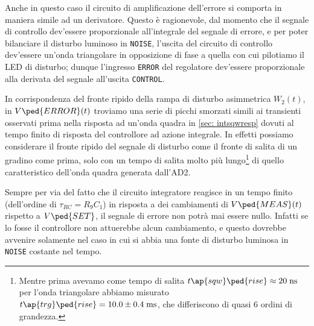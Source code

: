 \documentclass[10pt, a4paper, italian]{article}
\begin{document}
Anche in questo caso il circuito di amplificazione dell'errore si comporta
in maniera simile ad un derivatore. Questo è ragionevole, dal momento che il
segnale di controllo dev'essere proporzionale all'integrale del
segnale di errore, e per poter bilanciare il disturbo luminoso in \verb+NOISE+,
l'uscita del circuito di controllo dev'essere un'onda triangolare in
opposizione di fase a quella con cui pilotiamo il LED di disturbo; dunque
l'ingresso \verb+ERROR+ del regolatore dev'essere proporzionale alla derivata
del segnale all'uscita \verb+CONTROL+.

In corrispondenza del fronte ripido della rampa di disturbo asimmetrica
$W_2 (t)$, in $V\ped{ERROR} (t)$ troviamo una serie di picchi smorzati
simili ai transienti osservati prima nella risposta ad un'onda quadra
in \cref{sec: intsqwresp} dovuti al tempo finito di risposta del controllore
ad azione integrale.
In effetti possiamo considerare il fronte ripido del segnale di disturbo come
il fronte di salita di un gradino come prima, solo con un tempo di salita
molto più lungo\footnote{Mentre prima avevamo come tempo di salita
$t\ap{sqw}\ped{rise} \approx 20 \; \si{n\s}$ per l'onda triangolare abbiamo
misurato $t\ap{trg}\ped{rise} = 10.0 \pm 0.4 \; \si{m\s}$, che differiscono
di quasi 6 ordini di grandezza.} di quello caratteristico dell'onda quadra
generata dall'AD2.

Sempre per via del fatto che il circuito integratore reagisce in un tempo
finito (dell'ordine di $\tau_{RC} = R_9 C_1$) in risposta a dei cambiamenti
di $V\ped{MEAS} (t)$ rispetto a $V\ped{SET}$, il segnale di errore non potrà
mai essere nullo. Infatti se lo fosse il controllore non attuerebbe alcun
cambiamento, e questo dovrebbe avvenire solamente nel caso in cui si abbia
una fonte di disturbo luminosa in \verb+NOISE+ costante nel tempo.
\end{document}
